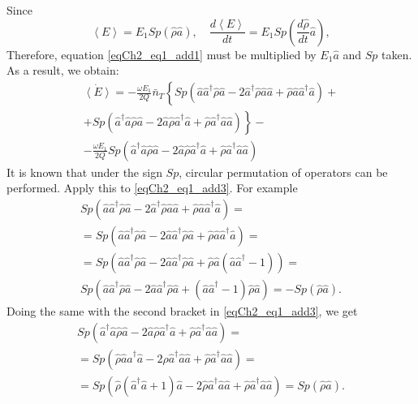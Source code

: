 Since 
\begin{equation}
\left<E\right> = E_1 Sp\left(\hat{\rho}\hat{a}\right), \quad
\frac{d \left<E\right>}{d t} = E_1 Sp\left(\frac{d \hat{\rho}}{dt}\hat{a}\right),
\label{eqCh2_eq1_add2}
\end{equation}
Therefore, equation \eqref{eqCh2_eq1_add1} must be multiplied by $E_1 \hat{a}$ and $Sp$ taken. As a result, we obtain:
\begin{eqnarray}
\dot{\left<E\right>} =
- \frac{\omega E_1}{2Q}\bar{n}_T
\left\{Sp\left(\hat{a}\hat{a}^{\dag}\hat{\rho}\hat{a} - 
2 \hat{a}^{\dag}\hat{\rho}\hat{a}\hat{a} +
\hat{\rho}\hat{a}\hat{a}^{\dag}\hat{a}\right) + 
\right.
\nonumber \\
+\left.
Sp\left(\hat{a}^{\dag}\hat{a}\hat{\rho}\hat{a} - 
2 \hat{a}\hat{\rho}\hat{a}^{\dag}\hat{a}
+ \hat{\rho}\hat{a}^{\dag}\hat{a}\hat{a}
\right)
\right\}
- 
\nonumber \\
- \frac{\omega E_1}{2Q}
Sp\left(\hat{a}^{\dag}\hat{a}\hat{\rho}\hat{a} - 
2 \hat{a}\hat{\rho}\hat{a}^{\dag}\hat{a}
+ \hat{\rho}\hat{a}^{\dag}\hat{a}\hat{a}
\right)
\label{eqCh2_eq1_add3}
\end{eqnarray}
It is known that under the sign $Sp$, circular permutation of operators can be performed. Apply this to \eqref{eqCh2_eq1_add3}.
For example
\begin{eqnarray}
Sp\left(\hat{a}\hat{a}^{\dag}\hat{\rho}\hat{a} - 
2 \hat{a}^{\dag}\hat{\rho}\hat{a}\hat{a} +
\hat{\rho}\hat{a}\hat{a}^{\dag}\hat{a}\right) = 
\nonumber \\
= Sp\left(\hat{a}\hat{a}^{\dag}\hat{\rho}\hat{a} - 
2 \hat{a}\hat{a}^{\dag}\hat{\rho}\hat{a} +
\hat{\rho}\hat{a}\hat{a}^{\dag}\hat{a}\right) = 
\nonumber \\
= Sp\left(\hat{a}\hat{a}^{\dag}\hat{\rho}\hat{a} - 
2 \hat{a}\hat{a}^{\dag}\hat{\rho}\hat{a} +
\hat{\rho}\hat{a}\left(\hat{a}\hat{a}^{\dag} - 1\right)\right) = 
\nonumber \\
Sp\left(\hat{a}\hat{a}^{\dag}\hat{\rho}\hat{a} - 
2 \hat{a}\hat{a}^{\dag}\hat{\rho}\hat{a} +
\left(\hat{a}\hat{a}^{\dag} - 1\right)\hat{\rho}\hat{a}\right) = 
- Sp\left(\hat{\rho}\hat{a}\right).
\label{eqCh2_eq1_add4}
\end{eqnarray}
Doing the same with the second bracket in \eqref{eqCh2_eq1_add3}, we get
\begin{eqnarray}
Sp\left(\hat{a}^{\dag}\hat{a}\hat{\rho}\hat{a} - 
2 \hat{a}\hat{\rho}\hat{a}^{\dag}\hat{a}
+ \hat{\rho}\hat{a}^{\dag}\hat{a}\hat{a} \right) = 
\nonumber \\
= 
Sp\left(\hat{\rho}\hat{a}\hat{a}^{\dag}\hat{a} - 
2 \hat{\rho}\hat{a}^{\dag}\hat{a}\hat{a}
+ \hat{\rho}\hat{a}^{\dag}\hat{a}\hat{a} \right) = 
\nonumber \\
= 
Sp\left(\hat{\rho}\left(\hat{a}^{\dag}\hat{a} + 1\right)\hat{a} - 
2 \hat{\rho}\hat{a}^{\dag}\hat{a}\hat{a}
+ \hat{\rho}\hat{a}^{\dag}\hat{a}\hat{a} \right) = 
Sp\left(\hat{\rho}\hat{a}\right).
\label{eqCh2_eq1_add5}
\end{eqnarray}
